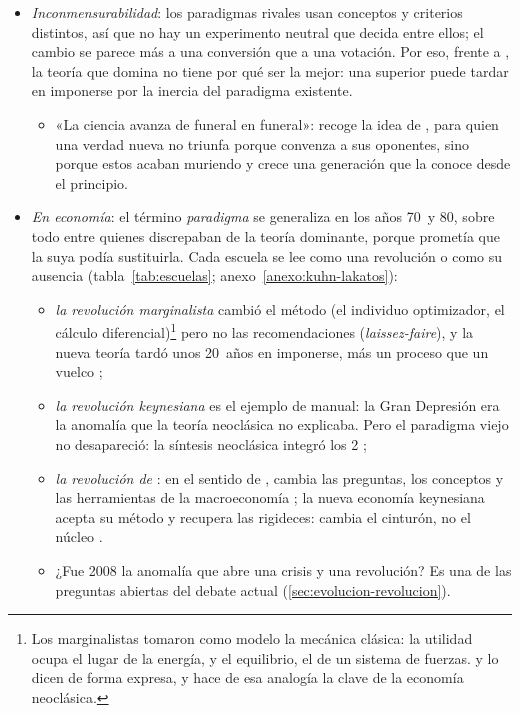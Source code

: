 \documentclass[11pt]{article}
\begin{document}
\begin{itemize}
\item \emph{Inconmensurabilidad}: los paradigmas rivales usan conceptos y criterios distintos, así que no hay un experimento neutral que decida entre ellos; el cambio se parece más a una conversión que a una votación. Por eso, frente a , la teoría que domina no tiene por qué ser la mejor: una superior puede tardar en imponerse por la inercia del paradigma existente.
  \begin{itemize}
  \item «La ciencia avanza de funeral en funeral»:  recoge la idea de , para quien una verdad nueva no triunfa porque convenza a sus oponentes, sino porque estos acaban muriendo y crece una generación que la conoce desde el principio\nocite{Planck1950Scientific}.
  \end{itemize}
\item \emph{En economía}: el término \emph{paradigma} se generaliza en los años 70~y 80, sobre todo entre quienes discrepaban de la teoría dominante, porque prometía que la suya podía sustituirla. Cada escuela se lee como una revolución o como su ausencia (tabla~\ref{tab:escuelas}; anexo~\ref{anexo:kuhn-lakatos}):
  \begin{itemize}
  \item \emph{la revolución marginalista} cambió el método (el individuo optimizador, el cálculo diferencial)\footnote{Los marginalistas tomaron como modelo la mecánica clásica: la utilidad ocupa el lugar de la energía, y el equilibrio, el de un sistema de fuerzas.  y  lo dicen de forma expresa, y \textcite{Mirowski1989Heat} hace de esa analogía la clave de la economía neoclásica.} pero no las recomendaciones (\emph{laissez-faire}), y la nueva teoría tardó unos 20~años en imponerse, más un proceso que un vuelco\nocite{Blaug1972Marginal} ;
  \item \emph{la revolución keynesiana} es el ejemplo de manual: la Gran Depresión era la anomalía que la teoría neoclásica no explicaba. Pero el paradigma viejo no desapareció: la síntesis neoclásica integró los 2  ;
  \item \emph{la revolución de }: en el sentido de , cambia las preguntas, los conceptos y las herramientas de la macroeconomía\nocite{DeVroey2016History} ; la nueva economía keynesiana acepta su método y recupera las rigideces: cambia el cinturón, no el núcleo .
  \end{itemize}
  \begin{itemize}
  \item ¿Fue 2008 la anomalía que abre una crisis y una revolución? Es una de las preguntas abiertas del debate actual (\ref{sec:evolucion-revolucion}).
  \end{itemize}
\end{itemize}
\end{document}
